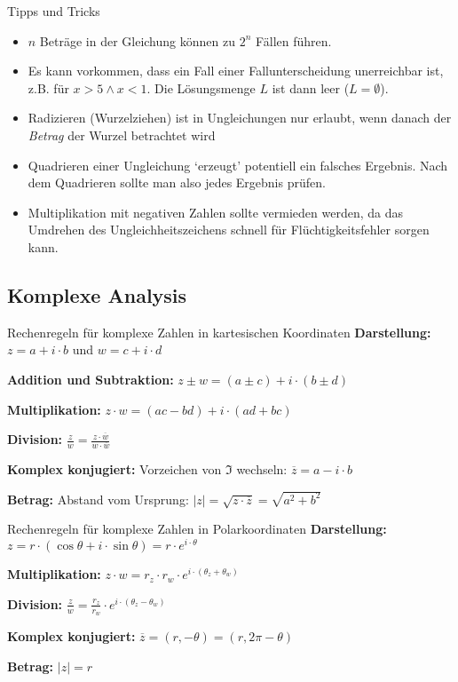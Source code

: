 \documentclass[german]{spicker}
\renewcommand{\abs}[1]{\left| #1 \right|}
\begin{document}
\begin{bonus}{Tipps und Tricks}
    \begin{itemize}
        \item $n$ Beträge in der Gleichung können zu $2^n$ Fällen führen.
        \item Es kann vorkommen, dass ein Fall einer Fallunterscheidung unerreichbar ist, z.B. für $x > 5 \land x < 1$. Die Lösungsmenge $L$ ist dann leer ($L = \emptyset$).
        \item Radizieren (Wurzelziehen) ist in Ungleichungen nur erlaubt, wenn danach der \emph{Betrag} der Wurzel betrachtet wird
        \item Quadrieren einer Ungleichung `erzeugt' potentiell ein falsches Ergebnis. Nach dem Quadrieren sollte man also jedes Ergebnis prüfen.
        \item Multiplikation mit negativen Zahlen sollte vermieden werden, da das Umdrehen des Ungleichheitszeichens schnell für Flüchtigkeitsfehler sorgen kann.
    \end{itemize}
\end{bonus}

\subsection{Komplexe Analysis}
\begin{bonus}{Rechenregeln für komplexe Zahlen in kartesischen Koordinaten}
    \textbf{Darstellung:} $z = a + i \cdot b$ und $w = c + i \cdot d$

    \textbf{Addition und Subtraktion:} $z \pm w = (a\pm c) + i \cdot (b \pm d)$

    \textbf{Multiplikation:} $z \cdot w = (ac -bd) + i \cdot (ad + bc)$

    \textbf{Division:} $\frac{z}{w} = \frac{z \cdot \overline{w}}{w \cdot \overline{w}}$

    \textbf{Komplex konjugiert:} Vorzeichen von $\Im$ wechseln: $\overline{z} = a- i \cdot b$

    \textbf{Betrag:} Abstand vom Ursprung: $\abs{z} = \sqrt{z \cdot \overline{z}} = \sqrt{a^2 + b^2}$
\end{bonus}

\begin{bonus}{Rechenregeln für komplexe Zahlen in Polarkoordinaten}
    \textbf{Darstellung:} $z = r \cdot (\cos\theta + i \cdot \sin \theta) = r \cdot e^{i \cdot \theta}$

    \textbf{Multiplikation:} $z \cdot w = r_z \cdot r_w \cdot e^{i \cdot (\theta_z + \theta_w)}$

    \textbf{Division:} $\frac{z}{w} = \frac{r_z}{r_w} \cdot e^{i \cdot (\theta_z - \theta_w)}$

    \textbf{Komplex konjugiert:} $\overline{z} = (r, -\theta) = (r, 2\pi - \theta)$

    \textbf{Betrag:} $\abs{z} = r$
\end{bonus}
\end{document}
